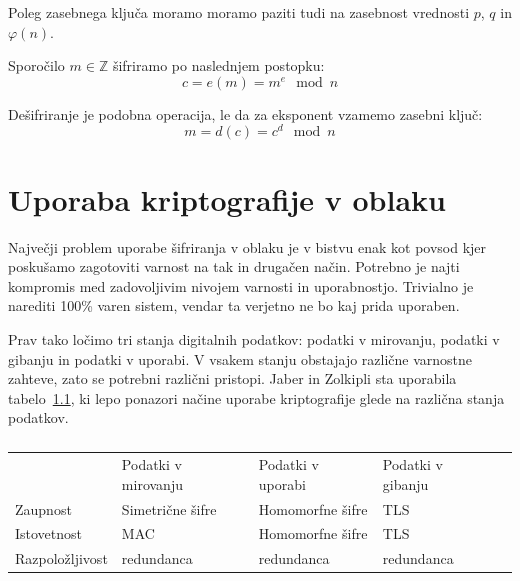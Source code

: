 \documentclass[12pt,a4paper,openany,tikz]{book}
\theoremstyle{plain}
\theoremstyle{definition}
\begin{document}
Poleg zasebnega ključa moramo moramo paziti tudi na zasebnost vrednosti $p$, $q$ in $\varphi(n)$.

Sporočilo $m \in \mathbb{Z}$ šifriramo po naslednjem postopku: $$c=e(m)=m^e \mod n$$

Dešifriranje je podobna operacija, le da za eksponent vzamemo zasebni ključ: $$m=d(c)=c^d \mod n$$

\chapter{Uporaba kriptografije v oblaku}
\label{chap:Uporaba kriptografije v oblaku}

Največji problem uporabe šifriranja v oblaku je v bistvu enak kot povsod kjer poskušamo zagotoviti varnost na tak in drugačen način. Potrebno je najti kompromis med zadovoljivim nivojem varnosti in uporabnostjo. Trivialno je narediti 100\% varen sistem, vendar ta verjetno ne bo kaj prida uporaben.

Prav tako ločimo tri stanja digitalnih podatkov: podatki v mirovanju, podatki v gibanju in podatki v uporabi. V vsakem stanju obstajajo različne varnostne zahteve, zato se potrebni različni pristopi. Jaber in Zolkipli\cite{jaber2013use} sta uporabila tabelo~\ref{tbl:cloudtriad}, ki lepo ponazori načine uporabe kriptografije glede na različna stanja podatkov.

\begin{table}[ht!]
  \centering
  \begin{tabular}{lllll}
                                        & Podatki v mirovanju                   & Podatki v uporabi                    & Podatki v gibanju              &  \\ \cline{2-4}
    \multicolumn{1}{l|}{Zaupnost}       & \multicolumn{1}{l|}{Simetrične šifre} & \multicolumn{1}{l|}{Homomorfne šifre} & \multicolumn{1}{l|}{TLS}        &  \\ \cline{2-4}
    \multicolumn{1}{l|}{Istovetnost}    & \multicolumn{1}{l|}{MAC}              & \multicolumn{1}{l|}{Homomorfne šifre} & \multicolumn{1}{l|}{TLS}        &  \\ \cline{2-4}
    \multicolumn{1}{l|}{Razpoložljivost} & \multicolumn{1}{l|}{redundanca}       & \multicolumn{1}{l|}{redundanca}       & \multicolumn{1}{l|}{redundanca} &  \\ \cline{2-4}
  \end{tabular}
  \caption{}
\label{tbl:cloudtriad}
\end{table}
\end{document}
